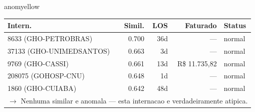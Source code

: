 \documentclass[a4paper,10pt]{article}
\begin{document}
\begin{anomalycard}[Internacao 6777 | GHO-PETROBRAS | MODERADO (z=2.21)]{anomyellow}
\begin{tabular}{l r r r l}\toprule\textbf{Intern.} & \textbf{Simil.} & \textbf{LOS} & \textbf{Faturado} & \textbf{Status} \\\midrule
8633 (GHO-PETROBRAS) & 0.700 & 36d & --- & \textcolor{jcubeblue}{normal} \\
37133 (GHO-UNIMEDSANTOS) & 0.663 & 3d & --- & \textcolor{jcubeblue}{normal} \\
9769 (GHO-CASSI) & 0.661 & 13d & R\$ 11.735,82 & \textcolor{jcubeblue}{normal} \\
208075 (GOHOSP-CNU) & 0.648 & 1d & --- & \textcolor{jcubeblue}{normal} \\
1860 (GHO-CUIABA) & 0.642 & 48d & --- & \textcolor{jcubeblue}{normal} \\
\multicolumn{5}{l}{\textcolor{jcubeblue}{\small $\rightarrow$ Nenhuma similar e anomala --- esta internacao e verdadeiramente atipica.}} \\
\bottomrule\end{tabular}


\end{anomalycard}

\newpage
\end{document}
